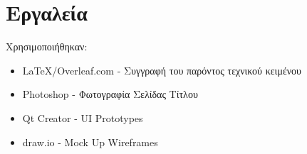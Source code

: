 \documentclass{article}
\begin{document}
\begin{center}
\end{center}

\begin{center}
\end{center}

\section{Εργαλεία}
Χρησιμοποιήθηκαν:
\begin{itemize}
    \item \LaTeX/Overleaf.com - Συγγραφή του παρόντος τεχνικού κειμένου
    \item Photoshop - Φωτογραφία Σελίδας Τίτλου
    \item Qt Creator - UI Prototypes
    \item draw.io - Mock Up Wireframes
\end{itemize}
\end{document}
